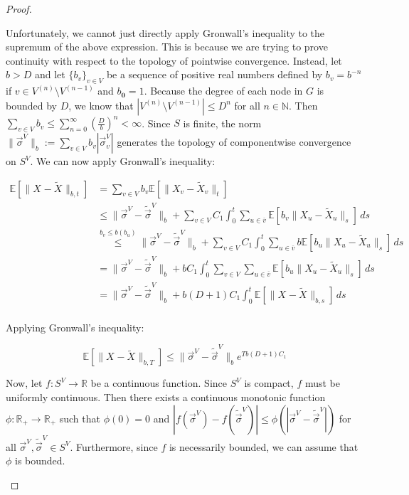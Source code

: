 \documentclass[12pt]{article}
\newcommand{\mb}{\mathbb}
\newcommand{\ra}{\rightarrow}
\newcommand{\ov}{\overline}
\newcommand{\os}{\overset}
\newcommand{\ind}{\hspace{24pt}}
\newcommand{\ex}[1]{\mb{E}\left[#1\right]}			%
\renewcommand{\root}{\mathbf{0}}				%
\renewcommand{\v}{v}							%
\newcommand{\vv}{u}								%
\renewcommand{\S}{S}							%
\newcommand{\s}{\sigma}							%
\newcommand{\sv}{\vec{\s}}						%
\renewcommand{\b}{b}							%
\newcommand{\T}{T}								%
\renewcommand{\t}{t}							%
\renewcommand{\tt}{s}							%
\newcommand{\X}{X}								%
\newcommand{\carp}[1]{^{#1}}					%
\newcommand{\vsi}[1]{^{#1}}						%
\newcommand{\cind}[1]{_{#1}}					%
\newcommand{\cl}{\ov}							%
\newcommand{\tip}[1]{#1}						%
\newcommand{\const}{C}							%
\newcommand{\degr}{D}							%
\newcommand{\sln}[1]{^{(#1)}}						%
\newcommand{\alt}[1]{\widetilde{#1}}			%
\newcommand{\indx}[1]{_{#1}}					%
\begin{document}
\begin{proof}
\begin{enumerate}[(a)]
\ind Unfortunately, we cannot just directly apply Gronwall's inequality to the supremum of the above expression. This is because we are trying to prove continuity with respect to the topology of pointwise convergence. Instead, let \(\b > \degr\) and let \(\{\b\cind{\v}\}_{\v \in V}\) be a sequence of positive real numbers defined by \(\b\cind{\v} = \b^{-n}\) if \(\v \in V\sln{n}\setminus V\sln{n-1}\) and \(\b\cind{\root} = 1\). Because the degree of each node in \(G\) is bounded by \(\degr\), we know that \(|V\sln{n}\setminus V\sln{n-1}| \leq \degr^{n}\) for all \(n\in \mb{N}\). Then \(\sum_{\v \in V} \b\cind{\v} \leq \sum_{n=0}^\infty \left(\frac{\degr}{\b}\right)^{n} < \infty\). Since \(\S\) is finite, the norm \(\|\sv\cind{}\vsi{V}\|_{\b} := \sum_{\v \in V} \b\cind{\v}|\sv\cind{\v}\vsi{V}|\) generates the topology of componentwise convergence on \(\S\carp{V}\). We can now apply Gronwall's inequality:

\begin{align*}
\ex{\|\X\cind{}\tip{} - \alt{\X}\cind{}\tip{}\|_{\b,\t}} &= \sum_{\v \in V} \b\cind{\v}\ex{\|\X\cind{\v}\tip{} - \alt{\X}\cind{\v}\tip{}\|_\t}\\
&\leq \|\sv\cind{}\vsi{V} - \alt{\sv}\cind{}\vsi{V}\|_{\b} + \sum_{\v \in V}\const\indx{1}\int_0^\t \sum_{\vv \in \cl{\v}} \ex{\b\cind{\v}\|\X\cind{\vv}\tip{} - \alt{\X}\cind{\vv}\tip{}\|_\tt}\,d\tt\\
&\os{\b\cind{\v}\leq \b(\b\cind{\vv})}{\leq} \|\sv\cind{}\vsi{V} - \alt{\sv}\cind{}\vsi{V}\|_{\b} + \sum_{\v \in V}\const\indx{1}\int_0^\t \sum_{\vv \in \cl{\v}} \b\ex{\b\cind{\vv}\|\X\cind{\vv}\tip{} - \alt{\X}\cind{\vv}\tip{}\|_\tt}\,d\tt\\
&= \|\sv\cind{}\vsi{V} - \alt{\sv}\cind{}\vsi{V}\|_{\b} + \b\const\indx{1}\int_0^\t \sum_{\v \in V}\sum_{\vv \in \cl{\v}} \ex{\b\cind{\vv}\|\X\cind{\vv}\tip{} - \alt{\X}\cind{\vv}\tip{}\|_\tt}\,d\tt\\
&=\|\sv\cind{}\vsi{V} - \alt{\sv}\cind{}\vsi{V}\|_{\b} + \b(\degr+1)\const\indx{1}\int_0^\t \ex{\|\X\cind{}\tip{} - \alt{\X}\cind{}\tip{}\|_{\b,\tt}}\,d\tt\\
\end{align*}

Applying Gronwall's inequality:

\[\ex{\|\X\cind{}\tip{} - \alt{\X}\cind{}\tip{}\|_{\b,\T}} \leq \|\sv\cind{}\vsi{V} - \alt{\sv}\cind{}\vsi{V}\|_{\b}e^{\T\b(\degr+1)\const\indx{1}}\]

Now, let \(f: \S\carp{V} \ra \mb{R}\) be a continuous function. Since \(\S\carp{V}\) is compact, \(f\) must be uniformly continuous. Then there exists a continuous monotonic function \(\phi: \mb{R}_+ \ra \mb{R}_+\) such that \(\phi(0) = 0\) and \(|f(\sv\cind{}\vsi{V}) - f(\alt{\sv}\cind{}\vsi{V})| \leq \phi(|\sv\cind{}\vsi{V} - \alt{\sv}\cind{}\vsi{V}|)\) for all \(\sv\cind{}\vsi{V},\alt{\sv}\cind{}\vsi{V}\in \S\carp{V}\). Furthermore, since \(f\) is necessarily bounded, we can assume that \(\phi\) is bounded.


\end{enumerate}
\end{proof}
\end{document}
